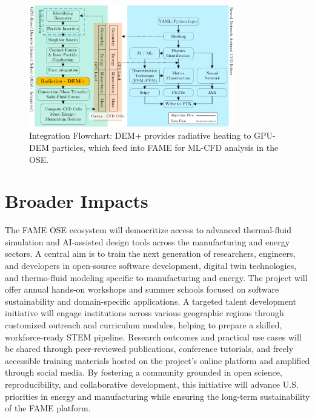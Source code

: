 \documentclass[11pt]{article}
\begin{document}
\begin{figure}[h]
\centering
\includegraphics[width=0.8\textwidth]{figures/Flowchart.pdf}
\caption{Integration Flowchart: DEM+ provides radiative heating to GPU-DEM particles, which feed into FAME for ML-CFD analysis in the OSE.}
\label{fig:integration}
\end{figure}

\section*{Broader Impacts}
\vspace{-3pt}
\noindent
The FAME OSE ecosystem will democritize access to advanced thermal-fluid simulation and AI-assisted design tools across the manufacturing and energy sectors. A central aim is to train the next generation of researchers, engineers, and developers in open-source software development, digital twin technologies, and thermo-fluid modeling specific to manufacturing and energy. The project will offer annual hands-on workshops and summer schools focused on software sustainability and domain-specific applications. A targeted talent development initiative will engage institutions across various geographic regions through customized outreach and curriculum modules, helping to prepare a skilled, workforce-ready STEM pipeline. Research outcomes and practical use cases will be shared through peer-reviewed publications, conference tutorials, and freely accessible training materials hosted on the project's online platform and amplified through social media. By fostering a community grounded in open science, reproducibility, and collaborative development, this initiative will advance U.S. priorities in energy and manufacturing while ensuring the long-term sustainability of the FAME platform.
\end{document}
